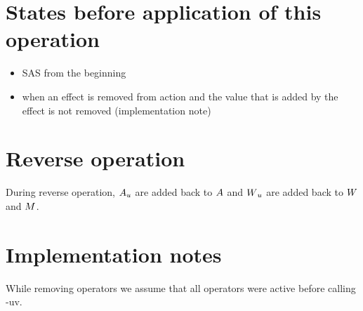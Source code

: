 	\section{States before application of this operation}
	\begin{itemize}
		\item SAS from the beginning
		\item when an effect is removed from action and the value that is added by the effect is not removed (implementation note)
	\end{itemize}
	
	\section{Reverse operation}
	During reverse operation, $A{}_u$ are added back to $A$ and $W{}_u$ are added back to $W$ and $M$.
	
	\section{Implementation notes}
	While removing operators we assume that all operators were active before calling -uv. 
	
	
	
	